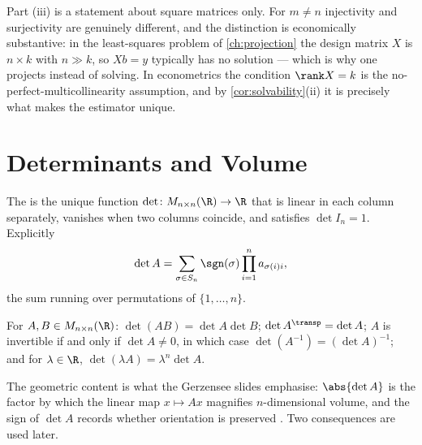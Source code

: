 \begin{remark}\label{rem:square-matters}
	Part (iii) is a statement about square matrices only. For $m\neq n$ injectivity
	and surjectivity are genuinely different, and the distinction is economically
	substantive: in the least-squares problem of \autoref{ch:projection} the design
	matrix $X$ is $n\times k$ with $n\gg k$, so $Xb=y$ typically has no solution ---
	which is why one projects instead of solving. In econometrics the
	condition $\rank X=k$ is the no-perfect-multicollinearity assumption, and by
	\autoref{cor:solvability}(ii) it is precisely what makes the estimator unique.
\end{remark}

\section{Determinants and Volume}\label{sec:lin-det}

\begin{definition}[Determinant]\label{def:determinant}
	The  is the unique function
	$\det\colon M_{n\times n}(\R)\to\R$ that is linear in each column separately,
	vanishes when two columns coincide, and satisfies $\det I_n=1$. Explicitly
	\[
		\det A=\sum_{\sigma\in S_n}\sgn(\sigma)\prod_{i=1}^n a_{\sigma(i)i},
	\]
	the sum running over permutations of $\{1,\dots,n\}$.
\end{definition}

\begin{proposition}[Properties]\label{prop:det-properties}
	For $A,B\in M_{n\times n}(\R)$: $\det(AB)=\det A\det B$;
	$\det A^{\transp}=\det A$; $A$ is invertible if and only if $\det A\neq0$, in
	which case $\det(A^{-1})=(\det A)^{-1}$; and for $\lambda\in\R$,
	$\det(\lambda A)=\lambda^n\det A$.
\end{proposition}

The geometric content is what the Gerzensee slides emphasise: $\abs{\det A}$ is
the factor by which the linear map $x\mapsto Ax$ magnifies $n$-dimensional
volume, and the sign of $\det A$ records whether orientation is preserved
\autocite[slide 15]{fukuda2026analysis}. Two consequences are used later.

